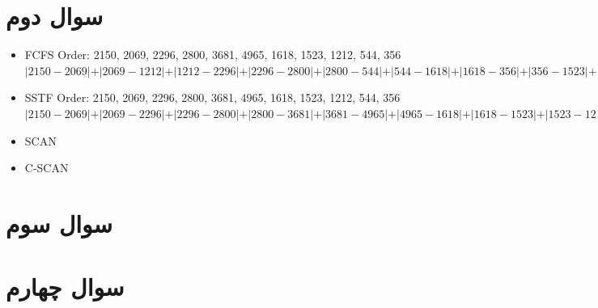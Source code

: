 \documentclass{article}
\begin{document}
\newpage

\section{سوال دوم}
\begin{latin}
\begin{itemize}
    \item [$\bullet$] FCFS
\newline
Order: 2150, 2069, 2296, 2800, 3681, 4965, 1618, 1523, 1212, 544, 356
\newline
$
\vert 2150-2069\vert + \vert 2069-1212\vert + \vert 1212-2296\vert + \vert 2296-2800\vert + \vert 2800-544\vert + \vert 544-1618\vert + \vert 1618-356\vert + \vert 356-1523\vert + \vert1523-4965\vert + \vert 4965-3681\vert = 13011
$
    \item [$\bullet$] SSTF
\newline
Order: 2150, 2069, 2296, 2800, 3681, 4965, 1618, 1523, 1212, 544, 356
\newline
$
\vert 2150-2069\vert + \vert 2069-2296\vert + \vert 2296-2800\vert + \vert 2800-3681\vert + \vert 3681-4965\vert + \vert 4965-1618\vert + \vert 1618-1523\vert + \vert 1523-1212\vert + \vert 1212-544\vert + \vert 544-356\vert = 7586
$
    \item [$\bullet$] SCAN
\newline
$
$
    \item [$\bullet$] C-SCAN
\newline
$
$
\end{itemize}
\end{latin}
\section{سوال سوم}

\section{سوال چهارم}
\end{document}
